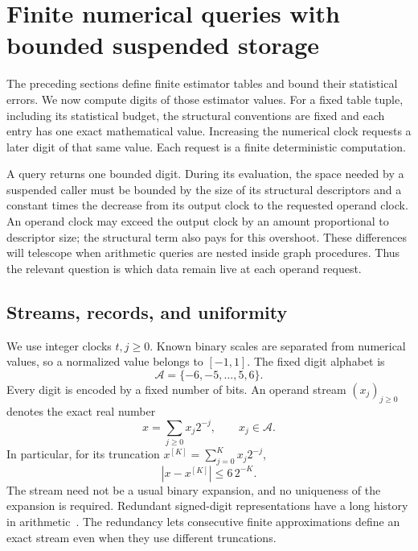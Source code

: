 \section{Finite numerical queries with bounded suspended storage}
\label{sec:arith}

The preceding sections define finite estimator tables and bound their
statistical errors.  We now compute digits of those estimator values.
For a fixed table tuple, including its statistical budget, the structural
conventions are fixed and each entry has one exact mathematical value.
Increasing the numerical clock requests a later digit of that same value.
Each request is a finite deterministic computation.

A query returns one bounded digit.  During its evaluation, the space
needed by a suspended caller must be bounded by the size of its
structural descriptors and a constant times the decrease from its
output clock to the requested operand clock.  An operand clock may
exceed the output clock by an amount proportional to descriptor size;
the structural term also pays for this overshoot.  These differences
will telescope when arithmetic queries are nested inside graph procedures.
Thus the relevant question is which data remain live at each operand request.

\subsection{Streams, records, and uniformity}

We use integer clocks $t,j\geq 0$.  Known binary scales are separated
from numerical values, so a normalized value belongs to $[-1,1]$.
The fixed digit alphabet is
\[
 \mathcal A=\{-6,-5,\ldots,5,6\}.
\]
Every digit is encoded by a fixed number of bits.  An operand stream
$(x_j)_{j\geq0}$ denotes the exact real number
\begin{equation}
 x=\sum_{j\geq0}x_j2^{-j},\qquad x_j\in\mathcal A.
 \label{eq:arith-stream}
\end{equation}
In particular, for its truncation $x^{[K]}=\sum_{j=0}^Kx_j2^{-j}$,
\begin{equation}
 |x-x^{[K]}|\leq 6\,2^{-K}.
 \label{eq:arith-tail}
\end{equation}
The stream need not be a usual binary expansion, and no uniqueness
of the expansion is required.
Redundant signed-digit representations have a long history in
arithmetic~\cite{Avizienis1963}.  The redundancy lets consecutive
finite approximations define an exact stream even when they use
different truncations.

